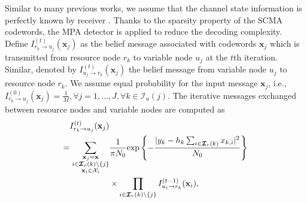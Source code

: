 \documentclass[journal]{IEEEtran}
\begin{document}


 Similar to many previous works, we assume that the channel state information  is perfectly known by receiver \cite{mheich2018design,cai2016multi,deka2020design,yu2015optimized,Zhang,li2020design,chen2020design}. 
Thanks to  the sparsity property of the SCMA codewords, the MPA detector is  applied to reduce the decoding complexity. Define $I_{{{{r}_{k}}\to {{u}_{j}}}^{{}}}^{(t)} ({\mathbf{x}_{j}})$ as the belief message associated with codewords $\mathbf{x}_{j}$ which is transmitted from resource node ${r}_{k}$  to variable node ${u}_{j}$  at the $t$th iteration. Similar, denoted by $I_{{{u}_{j}}\to {{r}_{k}}}^{{(t)}} ({\mathbf{x}_{j}})$ the  belief message from   variable node ${u}_{j}$ to  resource node ${r}_{k}$.  We assume equal  probability for the input message $\mathbf{x}_{j}$, i.e., $I_{{{r}_{k}}\to {{u}_{j}}}^{(0)}({\mathbf{x}_{j}})=\frac{1}{M},   \forall j=1,  \ldots, J, \forall k\in \boldsymbol{\boldsymbol{\mathcal {I}}}_u(j)$. The iterative messages exchanged between  resource nodes and  variable nodes are computed as
 \begin{equation}
  \small
  \label{FN_up}
 \begin{aligned}
 I_{r_k \rightarrow u_j}^{(t)}(\mathbf {x}_j) & \\ = \sum _{\substack{\mathbf {x}_j=\mathbf {x}\\ i\in \boldsymbol{\boldsymbol{\mathcal {I}}}_r(k)\backslash \lbrace j\rbrace \\ \mathbf {x}_i \in \mathcal {X}_{i}}} &\frac{1}{\pi N_0} \text{exp} \left\{-\frac{ \vert y_k -  h_{k}  \sum  _{i\in \boldsymbol{\boldsymbol{\mathcal {I}}}_r(k)}x_{k,i} \vert ^2}{N_0} \right\}\\ &\times \prod _{i\in \boldsymbol{\boldsymbol{\mathcal {I}}}_r(k)\backslash \lbrace j\rbrace } I_{u_i \rightarrow r_k}^{(t -1)}(\mathbf {x}_i), 
 \end{aligned}
\end{equation}
\end{document}
